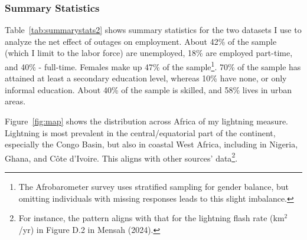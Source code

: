 \documentclass[12pt]{article}
\begin{document}
\subsubsection{Summary Statistics}
Table~\ref{tab:summarystats2} shows summary statistics for the two datasets I use to analyze the net effect of outages on employment. About 42\% of the sample (which I limit to the labor force) are unemployed, 18\% are employed part-time, and 40\%  - full-time. Females make up 47\% of the sample\footnote{The Afrobarometer survey uses stratified sampling for gender balance, but omitting individuals with missing responses leads to this slight imbalance.}. 70\% of the sample has attained at least a secondary education level, whereas 10\% have none, or only informal education. About 40\% of the sample is skilled, and 58\% lives in urban areas. 
\par
Figure~\ref{fig:map} shows the distribution across Africa of my lightning measure. Lightning is most prevalent in the central/equatorial part of the continent, especially the Congo Basin, but also in coastal West Africa, including in Nigeria, Ghana, and Côte d’Ivoire. This aligns with other sources' data\footnote{For instance, the pattern aligns with that for the lightning flash rate (km$^2$/yr) in Figure D.2 in Mensah (2024).}.
\clearpage
\end{document}
